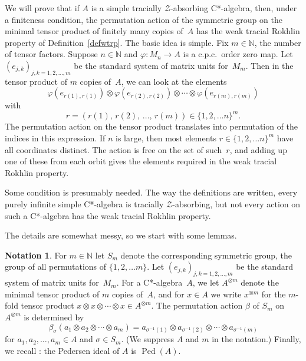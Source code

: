 \documentclass[11pt]{amsart}
\theoremstyle{plain}
\theoremstyle{definition}
\newtheorem{notation}[theorem]{Notation}
\theoremstyle{remark}
\numberwithin{equation}{section}
\newcommand{\N}{\mathbb{N}}
\newcommand{\Ped}{{\operatorname{Ped}}}
\newcommand{\bt}{\beta}
\newcommand{\sm}{\sigma}
\newcommand{\ph}{\varphi}
\begin{document}
\indent
We will prove that if $A$
is a simple tracially $\mathcal{Z}$-absorbing C*-algebra,
then, under a finiteness condition,
the permutation action of the symmetric group
on the minimal tensor product of finitely many copies of~$A$
has the weak tracial Rokhlin property
of Definition~\ref{defwtrp}.
The basic idea is simple.
Fix $m \in \N$,
the number of tensor factors.
Suppose $n \in \N$ and $\ph \colon M_{n} \to A$
is a c.p.c.~order zero map.
Let $(e_{j, k})_{j, k = 1, 2, \ldots, m}$
be the standard system of matrix units for~$M_m$.
Then in the tensor product of $m$ copies of~$A$,
we can look at the elements
\[
\ph (e_{r (1), r (1)}) \otimes \ph (e_{r (2), r (2)})
 \otimes \cdots \otimes \ph (e_{r (m), r (m)})
\]
with
\[
r = (r (1), \, r (2), \, \ldots, \, r (m)) \in \{ 1, 2, \ldots n \}^m.
\]
The permutation action on the tensor product
translates into permutation of the indices
in this expression.
If $n$ is large,
then most elements $r \in \{ 1, 2, \ldots n \}^m$
have all coordinates distinct.
The action is free on the set of such~$r$,
and adding up one of these from each orbit
gives the elements required in the weak tracial Rokhlin property.

Some condition is presumably needed.
The way the definitions are written,
every purely infinite simple C*-algebra
is tracially $\mathcal{Z}$-absorbing,
but not every action on such a C*-algebra
has the weak tracial Rokhlin property.

The details are somewhat messy,
so we start with some lemmas.

\begin{notation}\label{N_8808_Setup}
For $m \in \N$
let $S_m$ denote the corresponding symmetric group,
the group of all permutations of $\{ 1, 2, \ldots m \}$.
Let $(e_{j, k})_{j, k = 1, 2, \ldots, m}$
be the standard system of matrix units for~$M_m$.
For a C*-algebra~$A$,
we let $A^{\otimes m}$ denote the minimal
tensor product of $m$ copies of~$A$,
and for $x \in A$ we write
$x^{\otimes m}$
for the $m$-fold tensor product
$x \otimes x \otimes \cdots \otimes x \in A^{\otimes m}$.
The permutation action $\bt$ of $S_m$ on $A^{\otimes m}$
is determined by
\[
\bt_{\sm} (a_1 \otimes a_2 \otimes \cdots \otimes a_m)
 = a_{\sm^{-1} (1)} \otimes a_{\sm^{-1} (2)}
    \otimes \cdots \otimes a_{\sm^{-1} (m)}
\]
for $a_1, a_2, \ldots, a_m \in A$
and $\sm \in S_m$.
(We suppress $A$ and $m$ in the notation.)
Finally, we recall \cite[Notation~7.3]{AGJP21}:
the Pedersen ideal of $A$ is $\Ped (A)$.
\end{notation}
\end{document}
